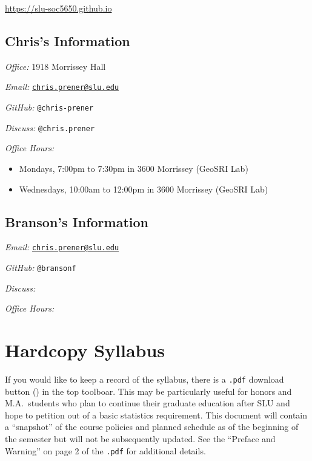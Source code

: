 \documentclass[]{book}
\begin{document}
\url{https://slu-soc5650.github.io}

\hypertarget{chriss-information}{%
\subsection*{Chris's Information}\label{chriss-information}}

\emph{Office:} 1918 Morrissey Hall

\emph{Email:} \href{mailto:chris.prener@slu.edu}{\nolinkurl{chris.prener@slu.edu}}

\emph{GitHub:} \texttt{@chris-prener}

\emph{Discuss:} \texttt{@chris.prener}

\emph{Office Hours:}

\begin{itemize}
\item
  Mondays, 7:00pm to 7:30pm in 3600 Morrissey (GeoSRI Lab)
\item
  Wednesdays, 10:00am to 12:00pm in 3600 Morrissey (GeoSRI Lab)
\end{itemize}

\hypertarget{bransons-information}{%
\subsection*{Branson's Information}\label{bransons-information}}

\emph{Email:} \href{mailto:chris.prener@slu.edu}{\nolinkurl{chris.prener@slu.edu}}

\emph{GitHub:} \texttt{@bransonf}

\emph{Discuss:}

\emph{Office Hours:}

\hypertarget{hardcopy-syllabus}{%
\section*{Hardcopy Syllabus}\label{hardcopy-syllabus}}

If you would like to keep a record of the syllabus, there is a \texttt{.pdf} download button () in the top toolboar. This may be particularly useful for honors and M.A.~students who plan to continue their graduate education after SLU and hope to petition out of a basic statistics requirement. This document will contain a ``snapshot'' of the course policies and planned schedule as of the beginning of the semester but will not be subsequently updated. See the ``Preface and Warning'' on page 2 of the \texttt{.pdf} for additional details.
\end{document}
